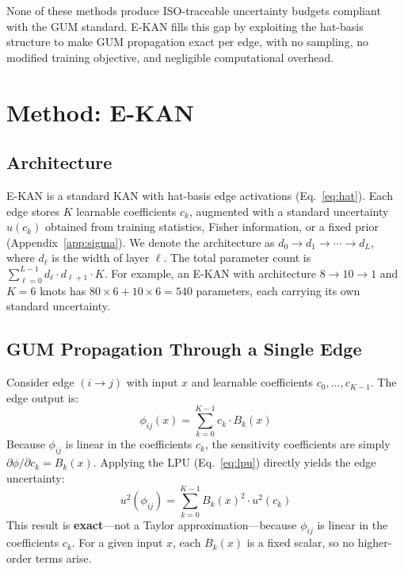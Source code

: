 \documentclass{article}
\begin{document}
None of these methods produce ISO-traceable uncertainty budgets compliant with
the GUM standard.  E-KAN fills this gap by exploiting the hat-basis structure
to make GUM propagation exact per edge, with no sampling, no modified training
objective, and negligible computational overhead.

\section{Method: E-KAN}
\label{sec:method}

\subsection{Architecture}

E-KAN is a standard KAN with hat-basis edge activations
(Eq.~\ref{eq:hat}).  Each edge stores $K$ learnable coefficients $c_k$,
augmented with a standard uncertainty $u(c_k)$ obtained from training
statistics, Fisher information, or a fixed prior (Appendix~\ref{app:sigma}).
We denote the architecture as $d_0 \to d_1 \to \cdots \to d_L$, where
$d_\ell$ is the width of layer $\ell$.  The total parameter count is
$\sum_{\ell=0}^{L-1} d_\ell \cdot d_{\ell+1} \cdot K$.  For example, an
E-KAN with architecture $8 \to 10 \to 1$ and $K=6$ knots has
$80 \times 6 + 10 \times 6 = 540$ parameters, each carrying its own
standard uncertainty.

\subsection{GUM Propagation Through a Single Edge}
\label{sec:edge-gum}

Consider edge $(i \to j)$ with input $x$ and learnable coefficients
$c_0, \ldots, c_{K-1}$.  The edge output is:
\begin{equation}
  \phi_{ij}(x) = \sum_{k=0}^{K-1} c_k \cdot B_k(x)
  \label{eq:edge}
\end{equation}
Because $\phi_{ij}$ is linear in the coefficients $c_k$, the sensitivity
coefficients are simply $\partial\phi/\partial c_k = B_k(x)$.  Applying the
LPU (Eq.~\ref{eq:lpu}) directly yields the edge uncertainty:
\begin{equation}
  u^2(\phi_{ij}) = \sum_{k=0}^{K-1} B_k(x)^2 \cdot u^2(c_k)
  \label{eq:edge-gum}
\end{equation}
This result is \textbf{exact}---not a Taylor approximation---because
$\phi_{ij}$ is linear in the coefficients $c_k$.  For a given input $x$,
each $B_k(x)$ is a fixed scalar, so no higher-order terms arise.
\end{document}
